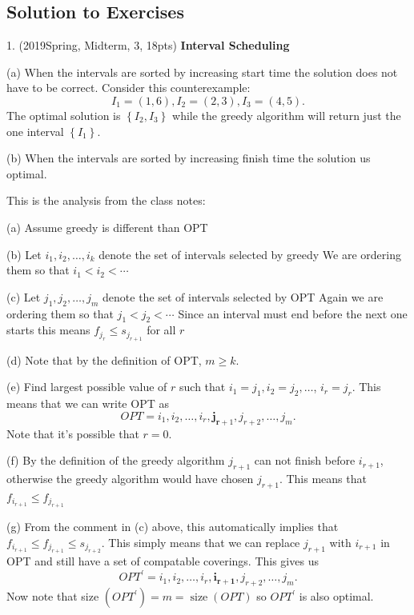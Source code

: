 \begin{spacing}{1.3}
    \newpage
    \section{Solution to Exercises}

    1. (2019Spring, Midterm, 3, 18pts) {\bf Interval Scheduling} 

    (a) When the intervals are sorted by increasing start time the solution does not have to be correct. Consider this counterexample:
    $$
    I_{1}=(1,6), I_{2}=(2,3), I_{3}=(4,5).
    $$
    The optimal solution is $\left\{I_{2}, I_{3}\right\}$ while the greedy algorithm will return just the one interval $\left\{I_{1}\right\}$.
    
    (b) When the intervals are sorted by increasing finish time the solution us optimal.
    
    This is the analysis from the class notes:
    
    \setlength{\parindent}{2em}

    (a) Assume greedy is different than OPT
    
    (b) Let $i_{1}, i_{2}, \ldots, i_{k}$ denote the set of intervals selected by greedy We are ordering them so that $i_{1}<i_{2}<\cdots$
    
    (c) Let $j_{1}, j_{2}, \ldots, j_{m}$ denote the set of intervals selected by OPT Again we are ordering them so that $j_{1}<j_{2}<\cdots$
    Since an interval must end before the next one starts this means $f_{j_{r}} \leq s_{j_{r+1}}$ for all $r$
    
    (d) Note that by the definition of OPT, $m \geq k$.
    
    (e) Find largest possible value of $r$ such that $i_{1}=j_{1}, i_{2}=j_{2}, \ldots$, $i_{r}=j_{r}$.
    This means that we can write OPT as
    $$
    O P T=i_{1}, i_{2}, \ldots, i_{r}, \mathbf{j}_{\mathbf{r}+1}, j_{r+2}, \ldots, j_{m} .
    $$
    Note that it's possible that $r=0$.
    
    (f) By the definition of the greedy algorithm $j_{r+1}$ can not finish before $i_{r+1}$, otherwise the greedy algorithm would have chosen $j_{r+1}$. This means that $f_{i_{r+1}} \leq f_{j_{r+1}}$
    
    (g) From the comment in (c) above, this automatically implies that $f_{i_{r+1}} \leq f_{j_{r+1}} \leq s_{j_{r+2}}$.
    This simply means that we can replace $j_{r+1}$ with $i_{r+1}$ in OPT and still have a set of compatable coverings. This gives us
    $$
    O P T^{\prime}=i_{1}, i_{2}, \ldots, i_{r}, \mathbf{i}_{\mathbf{r}+\mathbf{1}}, j_{r+2}, \ldots, j_{m} .
    $$
    Now note that size $\left(O P T^{\prime}\right)=m=\operatorname{size}(O P T)$ so $O P T^{\prime}$ is also optimal.
    

\end{spacing}
